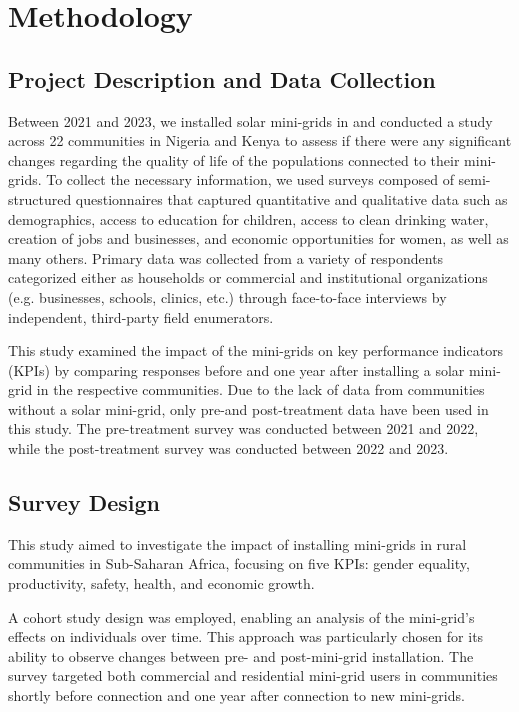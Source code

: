 \section{Methodology}
\label{sec:methodology}
\subsection{Project Description and Data Collection}
Between 2021 and 2023, we installed solar mini-grids in and conducted a study across 22 communities in Nigeria and Kenya to assess if there were any significant changes regarding the quality of life of the populations connected to their mini-grids. To collect the necessary information, we used surveys composed of semi-structured questionnaires that captured quantitative and qualitative data such as demographics, access to education for children, access to clean drinking water, creation of jobs and businesses, and economic opportunities for women, as well as many others. Primary data was collected from a variety of respondents categorized either as households or commercial and institutional organizations (e.g. businesses, schools, clinics, etc.) through face-to-face interviews by independent, third-party field enumerators.

This study examined the impact of the mini-grids on key performance indicators (KPIs) by comparing responses before and one year after installing a solar mini-grid in the respective communities. Due to the lack of data from communities without a solar mini-grid, only pre-and post-treatment data have been used in this study. The pre-treatment survey was conducted between 2021 and 2022, while the post-treatment survey was conducted between 2022 and 2023.

\subsection{Survey Design} 
This study aimed to investigate the impact of installing mini-grids in rural communities in Sub-Saharan Africa, focusing on five KPIs: gender equality, productivity, safety, health, and economic growth.

A cohort study design was employed, enabling an analysis of the mini-grid's effects on individuals over time. This approach was particularly chosen for its ability to observe changes between pre- and post-mini-grid installation. The survey targeted both commercial and residential mini-grid users in communities shortly before connection and one year after connection to new mini-grids.

